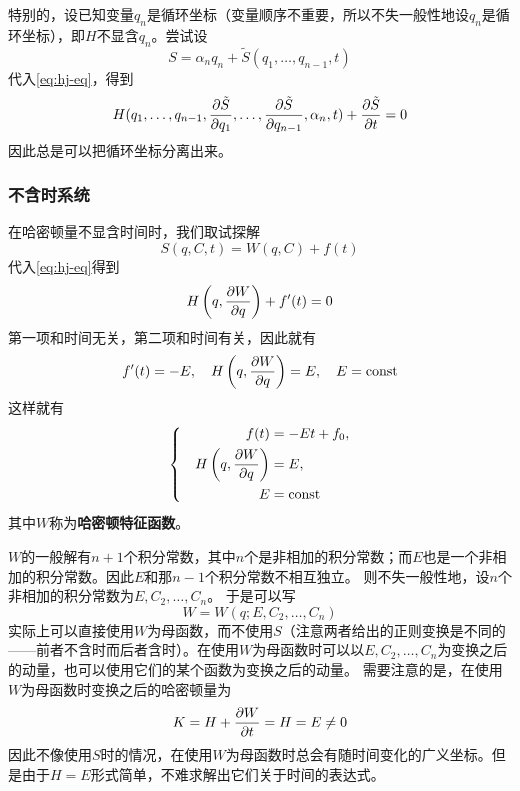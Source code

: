 \documentclass[UTF8, a4paper]{ctexart}
\newcommand*{\const}{\mathrm{const}}
\newenvironment{bigcase}{\left\{\quad\begin{aligned}}{\end{aligned}\right.}
\begin{document}
特别的，设已知变量$q_n$是循环坐标（变量顺序不重要，所以不失一般性地设$q_n$是循环坐标），即$H$不显含$q_n$。尝试设
\begin{equation}
    S = \alpha_n q_n + \tilde{S}(q_1, \ldots, q_{n-1}, t)
\end{equation}
代入\eqref{eq:hj-eq}，得到
\begin{equation}
    H(q_1, \ldots, q_{n-1}, \pdv{\tilde{S}}{q_1}, \ldots, \pdv{\tilde{S}}{q_{n-1}}, \alpha_n, t) + \pdv{\tilde{S}}{t} = 0
\end{equation}
因此总是可以把循环坐标分离出来。

\subsubsection{不含时系统}

在哈密顿量不显含时间时，我们取试探解
\begin{equation}
    S(q, C, t) = W(q, C) + f(t)
\end{equation}
代入\eqref{eq:hj-eq}得到
\[
    H\left(q, \pdv{W}{q}\right) + f'(t) = 0
\]
第一项和时间无关，第二项和时间有关，因此就有
\[
    f'(t) = -E, \quad H\left(q, \pdv{W}{q}\right) = E, \quad E = \const
\]
这样就有
\begin{equation}
    \begin{bigcase}
        f(t) &= -Et + f_0, \\
        H \left(q, \pdv{W}{q}\right) &= E, \\
        E &= \const
    \end{bigcase}
\end{equation}
其中$W$称为\textbf{哈密顿特征函数}。

$W$的一般解有$n+1$个积分常数，其中$n$个是非相加的积分常数；而$E$也是一个非相加的积分常数。因此$E$和那$n-1$个积分常数不相互独立。
则不失一般性地，设$n$个非相加的积分常数为$E, C_2, \ldots, C_n$。
于是可以写
\[
    W = W(q;E, C_2, \ldots, C_n)
\]
实际上可以直接使用$W$为母函数，而不使用$S$（注意两者给出的正则变换是不同的——前者不含时而后者含时）。在使用$W$为母函数时可以以$E, C_2, \ldots, C_n$为变换之后的动量，也可以使用它们的某个函数为变换之后的动量。
需要注意的是，在使用$W$为母函数时变换之后的哈密顿量为
\[
    K = H + \pdv{W}{t} = H = E \neq 0
\]
因此不像使用$S$时的情况，在使用$W$为母函数时总会有随时间变化的广义坐标。但是由于$H=E$形式简单，不难求解出它们关于时间的表达式。
\end{document}
